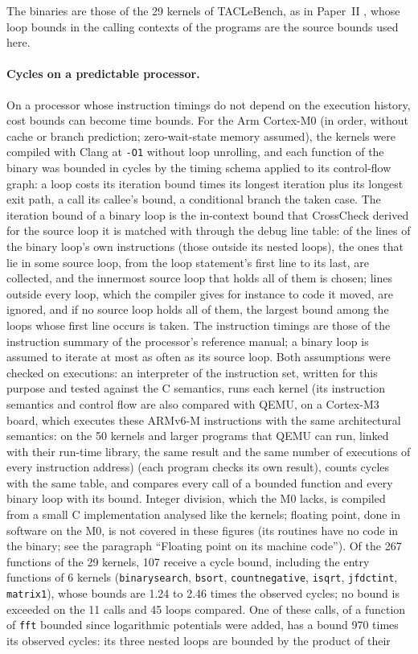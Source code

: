 \documentclass[oneside,english]{amsart}
\numberwithin{equation}{section}
\theoremstyle{plain}
\theoremstyle{definition}
\theoremstyle{plain}
\theoremstyle{plain}
\theoremstyle{remark}
\begin{document}
The binaries are those of the 29 kernels of TACLeBench, as in Paper~II \cite[Section~\ref{II-subsec:tacle}]{crosscheckTool}, whose loop bounds in the calling contexts of the programs are the source bounds used here.

\paragraph{Cycles on a predictable processor.}
On a processor whose instruction timings do not depend on the execution history, cost bounds can become time bounds. For the Arm Cortex-M0 (in order, without cache or branch prediction; zero-wait-state memory assumed), the kernels were compiled with Clang at \texttt{-O1} without loop unrolling, and each function of the binary was bounded in cycles by the timing schema applied to its control-flow graph: a loop costs its iteration bound times its longest iteration plus its longest exit path, a call its callee's bound, a conditional branch the taken case. The iteration bound of a binary loop is the in-context bound that CrossCheck derived for the source loop it is matched with through the debug line table: of the lines of the binary loop's own instructions (those outside its nested loops), the ones that lie in some source loop, from the loop statement's first line to its last, are collected, and the innermost source loop that holds all of them is chosen; lines outside every loop, which the compiler gives for instance to code it moved, are ignored, and if no source loop holds all of them, the largest bound among the loops whose first line occurs is taken. The instruction timings are those of the instruction summary of the processor's reference manual; a binary loop is assumed to iterate at most as often as its source loop. Both assumptions were checked on executions: an interpreter of the instruction set, written for this purpose and tested against the C semantics, runs each kernel (its instruction semantics and control flow are also compared with QEMU, on a Cortex-M3 board, which executes these ARMv6-M instructions with the same architectural semantics: on the 50 kernels and larger programs that QEMU can run, linked with their run-time library, the same result and the same number of executions of every instruction address) (each program checks its own result), counts cycles with the same table, and compares every call of a bounded function and every binary loop with its bound. Integer division, which the M0 lacks, is compiled from a small C implementation analysed like the kernels; floating point, done in software on the M0, is not covered in these figures (its routines have no code in the binary; see the paragraph ``Floating point on its machine code''). Of the 267 functions of the 29 kernels, 107 receive a cycle bound, including the entry functions of 6 kernels (\texttt{binarysearch}, \texttt{bsort}, \texttt{countnegative}, \texttt{isqrt}, \texttt{jfdctint}, \texttt{matrix1}), whose bounds are 1.24 to 2.46 times the observed cycles; no bound is exceeded on the 11 calls and 45 loops compared. One of these calls, of a function of \texttt{fft} bounded since logarithmic potentials were added, has a bound 970 times its observed cycles: its three nested loops are bounded by the product of their 
\end{document}
